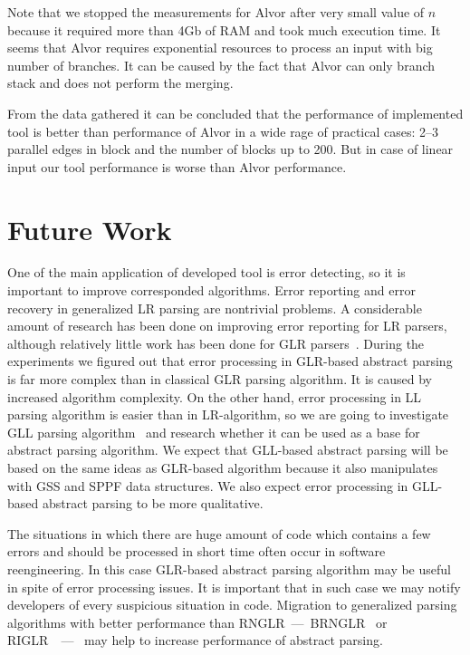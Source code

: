 \documentclass{sigplanconf}
\begin{document}
Note that we stopped the measurements for Alvor after very small value of $n$ because it required more than 4Gb of RAM and took much execution time. It seems that Alvor requires exponential resources to process an input with big number of branches. It can be caused by the fact that Alvor can only branch stack and does not perform the merging.


From the data gathered it can be concluded that the performance of implemented tool is better than performance of Alvor in a wide rage of practical cases: 2--3 parallel edges in block and the number of blocks up to 200. But in case of linear input our tool performance is worse than Alvor performance.

\section{Future Work}

One of the main application of developed tool is error detecting, so it is important to improve corresponded algorithms. Error reporting and error recovery in generalized LR parsing are nontrivial problems. A considerable amount of research has been done on improving error reporting for LR parsers, although relatively little work has been done for GLR parsers~\cite{GLROverview}. During the experiments we figured out that error processing in GLR-based abstract parsing is far more complex than in classical GLR parsing algorithm. It is caused by increased algorithm complexity. On the other hand, error processing in LL parsing algorithm is easier than in LR-algorithm, so we are going to investigate GLL parsing algorithm~\cite{GLL} and research whether it can be used as a base for abstract parsing algorithm. We expect that GLL-based abstract parsing will be based on the same ideas as GLR-based algorithm because it also manipulates with GSS and SPPF data structures. We also expect error processing in GLL-based abstract parsing to be more qualitative.

The situations in which there are huge amount of code which contains a few errors and should be processed in short time often occur in software reengineering. In this case GLR-based abstract parsing algorithm may be useful in spite of error processing issues. It is important that in such case we may notify developers of every suspicious situation in code. Migration to generalized parsing algorithms with better performance than RNGLR~---~BRNGLR~\cite{BRNGLR} or RIGLR~\cite{RIGLR}~---~ may help to increase performance of abstract parsing.
\end{document}
